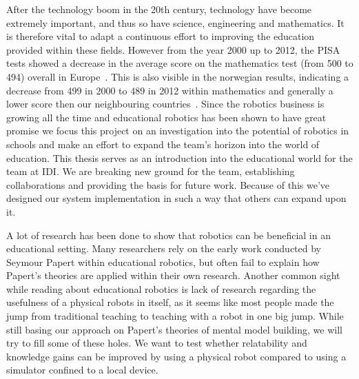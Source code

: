 After the technology boom in the 20th century, technology have become extremely important, and thus so have science, engineering and mathematics. It is therefore vital to adapt a continuous effort to improving the education provided within these fields. However from the year 2000 up to 2012, the PISA tests showed a decrease in the average score on the mathematics test (from 500 to 494) overall in Europe~\cite{OECDPISA2000, OECDPISA2012}. This is also visible in the norwegian results, indicating a decrease from 499 in 2000 to 489 in 2012 within mathematics and generally a lower score then our neighbouring countries~\cite{OECDPISA}.
Since the robotics business is growing all the time and educational robotics has been shown to have great promise we focus this project on an investigation into the potential of robotics in schools and make an effort to expand the \chirp team's horizon into the world of education. This thesis serves as an introduction into the educational world for the \chirp team at IDI. We are breaking new ground for the team, establishing collaborations and providing the basis for future work. 
Because of this we've designed our system implementation in such a way that others can expand upon it. 

\bigskip\noindent
A lot of research has been done to show that robotics can be beneficial in an educational setting.
Many researchers rely on the early work conducted by Seymour Papert within educational robotics, but often fail to explain how Papert's theories are applied within their own research. 
Another common sight while reading about educational robotics is lack of research regarding the usefulness of a physical robots in itself, as it seems like most people made the jump from traditional teaching to teaching with a robot in one big jump. 
While still basing our approach on Papert's theories of mental model building, we will try to fill some of these holes. We want to test whether relatability and knowledge gains can be improved by using a physical robot compared to using a simulator confined to a local device. 

